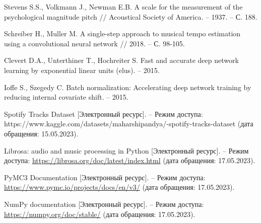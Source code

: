 \begin{thebibliography}{}
Stevens S.S., Volkmann J., Newman E.B. A scale for the measurement of the psychological magnitude pitch // Acoustical Society of America. -- 1937. -- С. 188.

Schreiber H., Muller M. A single-step approach to musical tempo estimation using a convolutional neural network // 2018. -- С. 98-105.

Clevert D.A., Unterthiner T., Hochreiter S. Fast and accurate deep network learning by exponential linear units (elus). -- 2015.

Ioffe S., Szegedy C. Batch normalization: Accelerating deep network training by reducing internal covariate shift. -- 2015.

Spotify Tracks Dataset [Электронный ресурс]. -- Режим доступа: https://www.kaggle.com/datasets/maharshipandya/-spotify-tracks-dataset (дата обращения: 15.05.2023).

Librosa: audio and music processing in Python [Электронный ресурс]. -- Режим доступа: \url{https://librosa.org/doc/latest/index.html} (дата обращения: 17.05.2023).

PyMC3 Documentation [Электронный ресурс]. -- Режим доступа: \url{https://www.pymc.io/projects/docs/en/v3/} (дата обращения: 17.05.2023).

NumPy documentation [Электронный ресурс]. -- Режим доступа: \url{https://numpy.org/doc/stable/} (дата обращения: 17.05.2023).

\end{thebibliography}
\endgroup